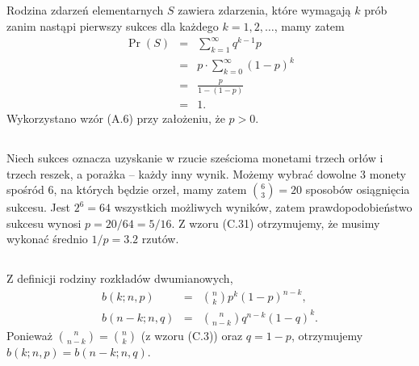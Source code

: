 \subsection{} %
Rodzina zdarzeń elementarnych $S$ zawiera zdarzenia, które wymagają $k$ prób zanim nastąpi pierwszy sukces dla każdego $k=1,2,\dots$, mamy zatem
\begin{eqnarray*}
	\Pr(S) &=& \sum_{k=1}^\infty q^{k-1}p \\
	&=& p\cdot\sum_{k=0}^\infty (1-p)^k \\
	&=& \frac{p}{1-(1-p)} \\
	&=& 1.
\end{eqnarray*}
Wykorzystano wzór (A.6) przy założeniu, że $p>0$.

\subsection{} %
Niech sukces oznacza uzyskanie w rzucie sześcioma monetami trzech orłów i trzech reszek, a porażka -- każdy inny wynik. Możemy wybrać dowolne $3$ monety spośród $6$, na których będzie orzeł, mamy zatem $\binom{6}{3}=20$ sposobów osiągnięcia sukcesu. Jest $2^6=64$ wszystkich możliwych wyników, zatem prawdopodobieństwo sukcesu wynosi $p=20/64=5/16$. Z wzoru (C.31) otrzymujemy, że musimy wykonać średnio $1/p=3.2$ rzutów.

\subsection{} %
Z definicji rodziny rozkładów dwumianowych,
\begin{eqnarray*}
	b(k;n,p) &=& \binom{n}{k}p^k(1-p)^{n-k}, \\
	b(n-k;n,q) &=& \binom{n}{n-k}q^{n-k}(1-q)^k.
\end{eqnarray*}
Ponieważ $\binom{n}{n-k} = \binom{n}{k}$ (z wzoru (C.3)) oraz $q=1-p$, otrzymujemy $b(k;n,p) = b(n-k;n,q)$.

